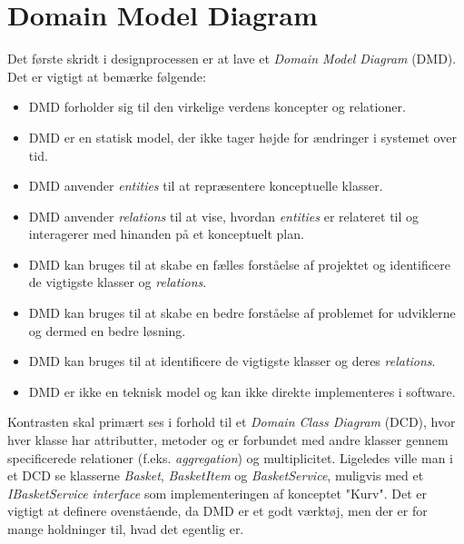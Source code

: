 \section{Domain Model Diagram}
\label{sec:domain-model-diagram}
Det første skridt i designprocessen er at lave et \emph{Domain Model Diagram} (DMD). Det er vigtigt at bemærke følgende:
\begin{itemize}
    \item DMD forholder sig til den virkelige verdens koncepter og relationer.
    \item DMD er en statisk model, der ikke tager højde for ændringer i systemet over tid.
    \item DMD anvender \emph{entities} til at repræsentere konceptuelle klasser.
    \item DMD anvender \emph{relations} til at vise, hvordan \emph{entities} er relateret til og interagerer med hinanden på et konceptuelt plan.
    \item DMD kan bruges til at skabe en fælles forståelse af projektet og identificere de vigtigste klasser og \emph{relations}.
    \item DMD kan bruges til at skabe en bedre forståelse af problemet for udviklerne og dermed en bedre løsning.
    \item DMD kan bruges til at identificere de vigtigste klasser og deres \emph{relations}.
    \item DMD er ikke en teknisk model og kan ikke direkte implementeres i software.
\end{itemize}
Kontrasten skal primært ses i forhold til et \emph{Domain Class Diagram} (DCD), hvor hver klasse har attributter, metoder og er forbundet med andre klasser gennem specificerede relationer (f.eks. \emph{aggregation}) og multiplicitet.
Ligeledes ville man i et DCD se klasserne \emph{Basket}, \emph{BasketItem} og \emph{BasketService}, muligvis med et \emph{IBasketService} \emph{interface} som implementeringen af konceptet "Kurv".
Det er vigtigt at definere ovenstående, da DMD er et godt værktøj, men der er for mange holdninger til, hvad det egentlig er.

